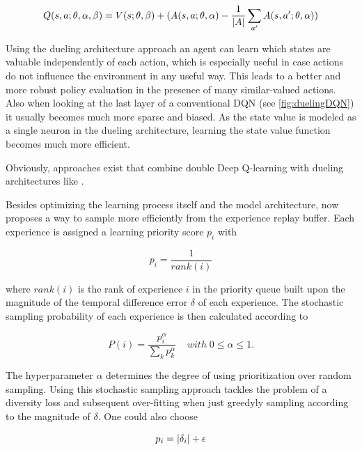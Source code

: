\begin{equation} \label{aggregation}
	Q(s, a; \theta, \alpha, \beta) = V(s; \theta, \beta) + (A(s, a; \theta, \alpha) - \frac{1}{\lvert A\rvert} \sum_{a'}A(s, a'; \theta, \alpha)) 
\end{equation}

Using the dueling architecture approach an agent can learn which states are valuable independently of each action, which is especially useful in case actions do not influence the environment in any useful way. This leads to a better and more robust policy evaluation in the presence of many similar-valued actions. Also when looking at the last layer of a conventional DQN (see \autoref{fig:duelingDQN}) it usually becomes much more sparse and biased. As the state value is modeled as a single neuron in the dueling architecture, learning the state value function becomes much more efficient. 

Obviously, approaches exist that combine double Deep Q-learning with dueling architectures like \cite{Huang2018}. 

Besides optimizing the learning process itself and the model architecture, \cite{Schaul2016} now proposes a way to sample more efficiently from the experience replay buffer. Each experience is assigned a learning priority score $p_i$ with 

\begin{equation} \label{prio}
	p_i = \frac{1}{rank(i)}
\end{equation}

where $rank(i)$ is the rank of experience $i$ in the priority queue built upon the magnitude of the temporal difference error $\delta$ of each experience. The stochastic sampling probability of each experience is then calculated according to 

\begin{equation} \label{prob}
	P(i) = \frac{p_i^{\alpha}}{\sum_k p_k^{\alpha}} \;\;\;\; with \; 0\le\alpha\le1.
\end{equation}

The hyperparameter $\alpha$ determines the degree of using prioritization over random sampling. Using this stochastic sampling approach tackles the problem of a diversity loss and subsequent over-fitting when just greedyly sampling according to the magnitude of $\delta$. One could also choose 

\begin{equation} \label{prio2}
	p_i = \lvert\delta_i\rvert + \epsilon
\end{equation}

